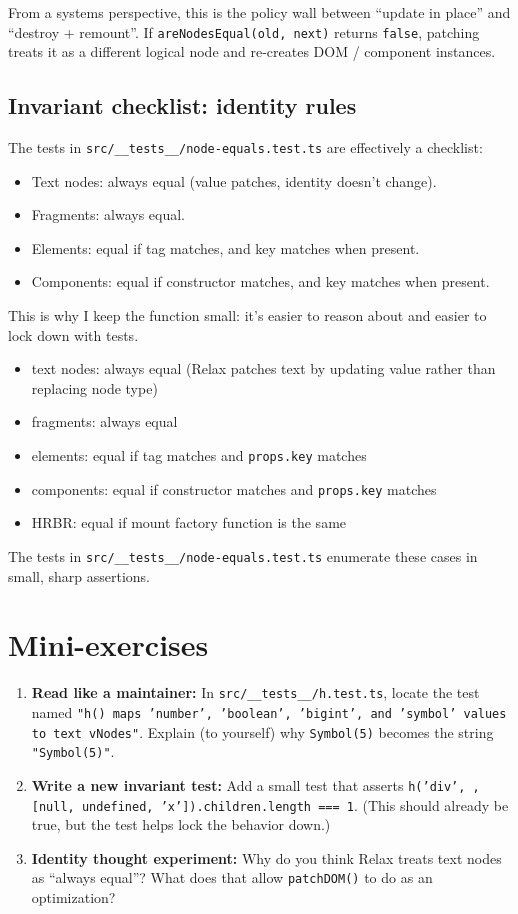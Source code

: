 From a systems perspective, this is the policy wall between ``update in place'' and ``destroy + remount''.
If \texttt{areNodesEqual(old, next)} returns \texttt{false}, patching treats it as a different logical node and re-creates DOM / component instances.

\subsection*{Invariant checklist: identity rules}
The tests in \texttt{src/\_\_tests\_\_/node-equals.test.ts} are effectively a checklist:

\begin{itemize}
  \item Text nodes: always equal (value patches, identity doesn't change).
  \item Fragments: always equal.
  \item Elements: equal if tag matches, and key matches when present.
  \item Components: equal if constructor matches, and key matches when present.
\end{itemize}

This is why I keep the function small: it's easier to reason about and easier to lock down with tests.

\begin{itemize}
  \item text nodes: always equal (Relax patches text by updating value rather than replacing node type)
  \item fragments: always equal
  \item elements: equal if tag matches and \texttt{props.key} matches
  \item components: equal if constructor matches and \texttt{props.key} matches
  \item HRBR: equal if mount factory function is the same
\end{itemize}

The tests in \texttt{src/\_\_tests\_\_/node-equals.test.ts} enumerate these cases in small, sharp assertions.

\section{Mini-exercises}
\begin{enumerate}
  \item \textbf{Read like a maintainer:} In \texttt{src/\_\_tests\_\_/h.test.ts}, locate the test named \texttt{"h() maps 'number', 'boolean', 'bigint', and 'symbol' values to text vNodes"}. Explain (to yourself) why \texttt{Symbol(5)} becomes the string \texttt{"Symbol(5)"}.
  \item \textbf{Write a new invariant test:} Add a small test that asserts \texttt{h('div', {}, [null, undefined, 'x']).children.length === 1}. (This should already be true, but the test helps lock the behavior down.)
  \item \textbf{Identity thought experiment:} Why do you think Relax treats text nodes as ``always equal''? What does that allow \texttt{patchDOM()} to do as an optimization?
\end{enumerate}

